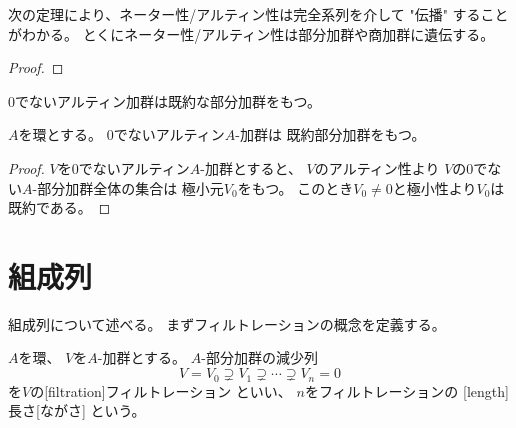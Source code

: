 \documentclass[report]{jlreq}
\begin{document}
次の定理により、ネーター性/アルティン性は完全系列を介して "伝播" することがわかる。
とくにネーター性/アルティン性は部分加群や商加群に遺伝する。


\begin{proof}
    \TODO{}
\end{proof}

$0$でないアルティン加群は既約な部分加群をもつ。

\begin{theorem}[既約部分加群の存在]
    $A$を環とする。
    $0$でないアルティン$A$-加群は
    既約部分加群をもつ。
\end{theorem}

\begin{proof}
    $V$を$0$でないアルティン$A$-加群とすると、
    $V$のアルティン性より
    $V$の$0$でない$A$-部分加群全体の集合は
    極小元$V_0$をもつ。
    このとき$V_0 \neq 0$と極小性より$V_0$は既約である。
\end{proof}



%
\section{組成列}

組成列について述べる。
まずフィルトレーションの概念を定義する。

\begin{definition}[フィルトレーション]
    $A$を環、
    $V$を$A$-加群とする。
    $A$-部分加群の減少列
    \begin{equation}
        V = V_0 \supsetneq V_1 \supsetneq \cdots \supsetneq V_n = 0
    \end{equation}
    を$V$の[filtration]{フィルトレーション}
    といい、
    $n$をフィルトレーションの
    [length]{長さ}[ながさ]
    という。
\end{definition}
\end{document}
